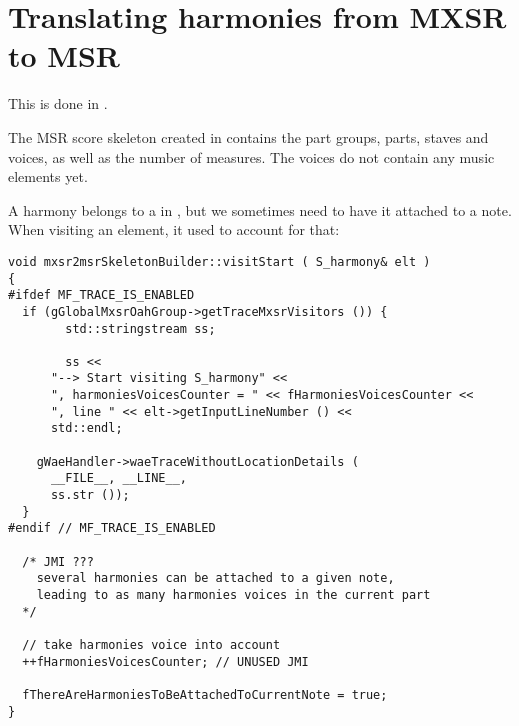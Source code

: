 \section{Translating harmonies from MXSR to MSR}

This is done in \mxsrToMsr{}.

The MSR score skeleton created in  contains the part groups, parts, staves and voices, as well as the number of measures. The voices do not contain any music elements yet.

A harmony belongs to a  in \mxml, but we sometimes need to have it attached to a note. When visiting an  element,  it used to account for that:%
\begin{lstlisting}[language=CPlusPlus]
void mxsr2msrSkeletonBuilder::visitStart ( S_harmony& elt )
{
#ifdef MF_TRACE_IS_ENABLED
  if (gGlobalMxsrOahGroup->getTraceMxsrVisitors ()) {
		std::stringstream ss;

		ss <<
      "--> Start visiting S_harmony" <<
      ", harmoniesVoicesCounter = " << fHarmoniesVoicesCounter <<
      ", line " << elt->getInputLineNumber () <<
      std::endl;

    gWaeHandler->waeTraceWithoutLocationDetails (
      __FILE__, __LINE__,
      ss.str ());
  }
#endif // MF_TRACE_IS_ENABLED

  /* JMI ???
    several harmonies can be attached to a given note,
    leading to as many harmonies voices in the current part
  */

  // take harmonies voice into account
  ++fHarmoniesVoicesCounter; // UNUSED JMI

  fThereAreHarmoniesToBeAttachedToCurrentNote = true;
}
\end{lstlisting}

